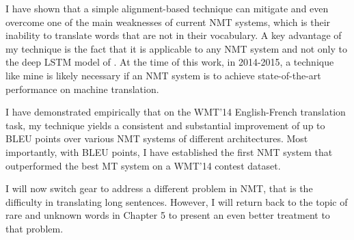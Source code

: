 I have shown that a simple alignment-based technique can mitigate and even
overcome one of the main weaknesses of current NMT systems, which is
their inability to translate words that are not in their vocabulary.  
A key advantage of my technique is the fact that it is applicable to any NMT system and not
only to the deep LSTM model of . At the time of this work, in 2014-2015, a technique
like mine is likely necessary if an NMT system is to achieve state-of-the-art performance
on machine translation.

I have demonstrated empirically that on the WMT'14 English-French translation task, my technique yields a 
consistent and substantial improvement of up to \bestunkimp{} BLEU points over various NMT systems of different architectures. 
Most importantly, with \bestbleuunk{} BLEU points, I have established the first NMT system that outperformed 
the best MT system on a WMT'14 contest dataset.

I will now switch gear to address a different problem in NMT,
that is the difficulty in translating long sentences. However, I will return back
to the topic of rare and unknown words in Chapter 5 to present an even better treatment to that problem.

